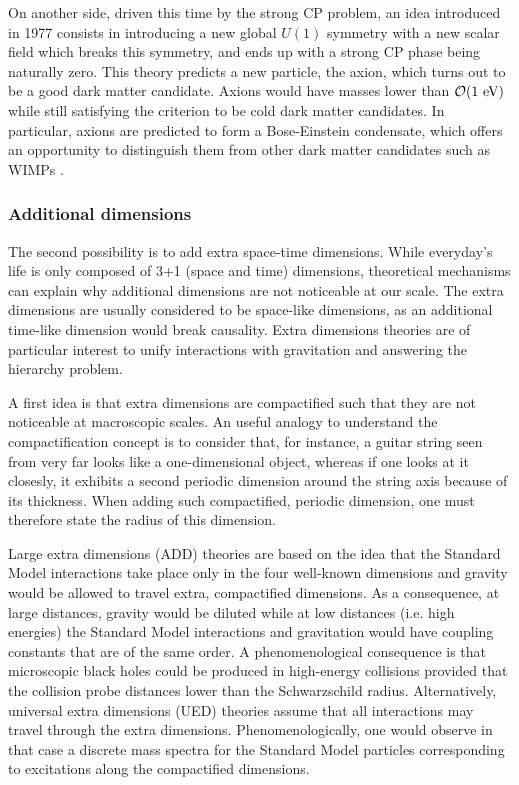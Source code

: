         On another side, driven this time by the strong CP problem,
        an idea introduced in 1977 \cite{PecceiQuinnAxion} consists in introducing a new
        global $U(1)$ symmetry with a new scalar field which breaks this symmetry, and
        ends up with a strong CP phase being naturally zero. This theory predicts a new
        particle, the axion, which turns out to be a good dark matter candidate.
        Axions would have masses lower than $\mathcal{O}(1~\text{eV})$ while still satisfying
        the criterion to be cold dark matter candidates. In particular, axions are predicted to
        form a Bose-Einstein condensate, which offers an opportunity to distinguish them
        from other dark matter candidates such as WIMPs \cite{AxionBoseEinstein}.

        \subsubsection{Additional dimensions}

        The second possibility is to add extra space-time dimensions. While everyday's life
        is only composed of 3+1 (space and time) dimensions, theoretical mechanisms can
        explain why additional dimensions are not noticeable at our scale.
        The extra dimensions are usually considered to be space-like dimensions, as an
        additional time-like dimension would break causality. Extra dimensions theories
        are of particular interest to unify interactions with gravitation and answering
        the hierarchy problem.

        A first idea is that extra dimensions are compactified such that they are not
        noticeable at macroscopic scales. An useful analogy to understand the
        compactification concept is to consider that, for instance, a guitar string
        seen from very far looks like a one-dimensional object, whereas if one looks at it
        closesly, it exhibits a second periodic dimension around the string axis because of its
        thickness. When adding such compactified, periodic dimension, one must therefore
        state the radius of this dimension.

        Large extra dimensions (ADD) \cite{ADD} theories are based on the idea that the
        Standard Model interactions take place only in the four well-known dimensions and
        gravity would be allowed to travel extra, compactified dimensions. As a consequence,
        at large distances, gravity would be diluted while at low distances (i.e. high
        energies) the Standard Model interactions and gravitation would have coupling
        constants that are of the same order. A phenomenological consequence is that microscopic
        black holes could
        be produced in high-energy collisions provided that the collision probe distances
        lower than the Schwarzschild radius. Alternatively, universal extra dimensions
        (UED) \cite{UED} theories assume that all interactions may travel through the extra
        dimensions. Phenomenologically, one would observe in that case a discrete mass
        spectra for the Standard Model particles corresponding to excitations along the
        compactified dimensions.

